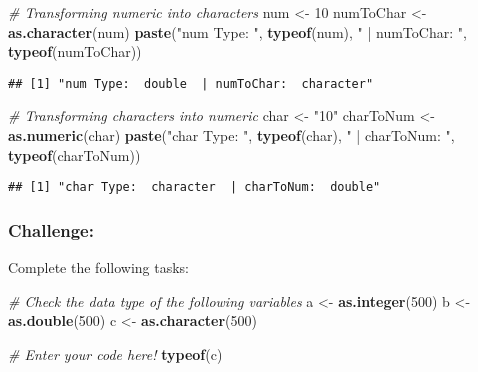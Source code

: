 \documentclass[
]{article}
\newenvironment{Shaded}{\begin{snugshade}}{\end{snugshade}}
\newcommand{\CommentTok}[1]{\textcolor[rgb]{0.56,0.35,0.01}{\textit{#1}}}
\newcommand{\DecValTok}[1]{\textcolor[rgb]{0.00,0.00,0.81}{#1}}
\newcommand{\FunctionTok}[1]{\textcolor[rgb]{0.13,0.29,0.53}{\textbf{#1}}}
\newcommand{\NormalTok}[1]{#1}
\newcommand{\OtherTok}[1]{\textcolor[rgb]{0.56,0.35,0.01}{#1}}
\newcommand{\StringTok}[1]{\textcolor[rgb]{0.31,0.60,0.02}{#1}}
\begin{document}
\begin{Shaded}
\begin{Highlighting}[]
\CommentTok{\# Transforming numeric into characters}
\NormalTok{num }\OtherTok{\textless{}{-}} \DecValTok{10}
\NormalTok{numToChar }\OtherTok{\textless{}{-}} \FunctionTok{as.character}\NormalTok{(num)}
\FunctionTok{paste}\NormalTok{(}\StringTok{"num Type: "}\NormalTok{, }\FunctionTok{typeof}\NormalTok{(num), }\StringTok{" | numToChar: "}\NormalTok{, }\FunctionTok{typeof}\NormalTok{(numToChar))}
\end{Highlighting}
\end{Shaded}

\begin{verbatim}
## [1] "num Type:  double  | numToChar:  character"
\end{verbatim}

\begin{Shaded}
\begin{Highlighting}[]
\CommentTok{\# Transforming characters into numeric}
\NormalTok{char }\OtherTok{\textless{}{-}} \StringTok{"10"}
\NormalTok{charToNum }\OtherTok{\textless{}{-}} \FunctionTok{as.numeric}\NormalTok{(char)}
\FunctionTok{paste}\NormalTok{(}\StringTok{"char Type: "}\NormalTok{, }\FunctionTok{typeof}\NormalTok{(char), }\StringTok{" | charToNum: "}\NormalTok{, }\FunctionTok{typeof}\NormalTok{(charToNum))}
\end{Highlighting}
\end{Shaded}

\begin{verbatim}
## [1] "char Type:  character  | charToNum:  double"
\end{verbatim}

\subsubsection{Challenge:}\label{challenge}

Complete the following tasks:

\begin{Shaded}
\begin{Highlighting}[]
\CommentTok{\# Check the data type of the following variables}
\NormalTok{a }\OtherTok{\textless{}{-}} \FunctionTok{as.integer}\NormalTok{(}\DecValTok{500}\NormalTok{)}
\NormalTok{b }\OtherTok{\textless{}{-}} \FunctionTok{as.double}\NormalTok{(}\DecValTok{500}\NormalTok{)}
\NormalTok{c }\OtherTok{\textless{}{-}} \FunctionTok{as.character}\NormalTok{(}\DecValTok{500}\NormalTok{)}

\CommentTok{\# Enter your code here!}
\FunctionTok{typeof}\NormalTok{(c)}
\end{Highlighting}
\end{Shaded}
\end{document}
